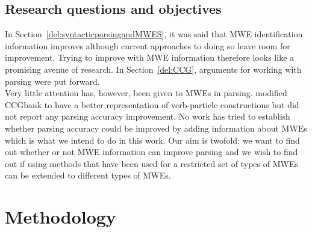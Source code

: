 \documentclass[output=paper]{langsci/langscibook}
\begin{document}
                        \subsection{Research questions and objectives}
                        \label{del:relworkccl}
                        \indent  In Section~\ref{del:syntacticparsingandMWES}, it was said that MWE identification information improves  although current approaches to doing so leave room for improvement. Trying to improve  with MWE information therefore looks like a promising avenue of research. In Section~\ref{del:CCG}, arguments for working with  parsing were put forward.\\
                        \indent Very little attention has, however, been given to MWEs in  parsing. \citet{constablecurran} modified CCGbank to have a better representation of verb-particle constructions but did not report any parsing accuracy improvement. No work has tried to establish whether  parsing accuracy could be improved by adding information about MWEs which is what we intend to do in this work. Our aim is twofold: we want to find out whether or not MWE information can improve  parsing and we wish to find out if using methods that have been used for a restricted set of types of MWEs can be extended to different types of MWEs. 

\section{Methodology}
\label{del:methodology}
\end{document}
